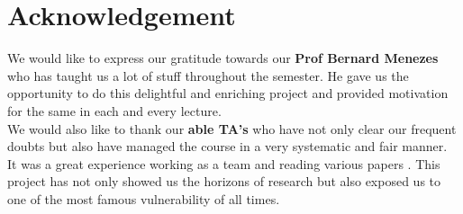 \documentclass[12pt]{article}
\begin{document}
\section{Acknowledgement}
We would like to express our gratitude towards our \textbf{Prof Bernard Menezes} who has taught us a lot of stuff throughout the semester. He gave us the opportunity to do this delightful and enriching project and provided motivation for the same in each and every lecture.\\

We would also like to thank our \textbf{able TA's} who have not only clear our frequent doubts but also have managed the course in a very systematic and fair manner.\\

It was a great experience working as a team and reading various papers . This project has not only showed us the horizons of research but also exposed us to one of the most famous vulnerability of all times.
  
\end{document}

